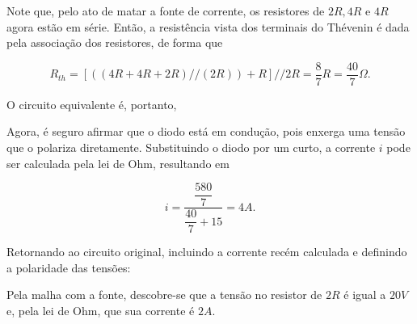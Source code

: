 \documentclass{article}
\numberwithin{equation}{section}
\let\dfr\dfrac
\begin{document}
\noindent Note que, pelo ato de matar a fonte de corrente, os resistores de $2R, 4R$ e $4R$ agora estão em série. Então, a resistência vista dos terminais do Thévenin é dada pela associação dos resistores, de forma que

\begin{equation}
    R_{th} = [((4R+4R+2R)//(2R)) + R]//2R = \dfr{8}{7}R = \dfr{40}{7}\Omega.
\end{equation}

\noindent O circuito equivalente é, portanto,

\begin{center}
\end{center}

\noindent Agora, é seguro afirmar que o diodo está em condução, pois enxerga uma tensão que o polariza diretamente. Substituindo o diodo por um curto, a corrente $i$ pode ser calculada pela lei de Ohm, resultando em

\begin{equation*}
    i = \dfr{\dfr{580}{7}}{\dfr{40}{7}+15} = 4A.
\end{equation*}

\noindent Retornando ao circuito original, incluindo a corrente recém calculada e definindo a polaridade das tensões:

\begin{center}
\end{center}

\noindent Pela malha com a fonte, descobre-se que a tensão no resistor de $2R$ é igual a $20V$ e, pela lei de Ohm, que sua corrente é $2A$.
\end{document}
